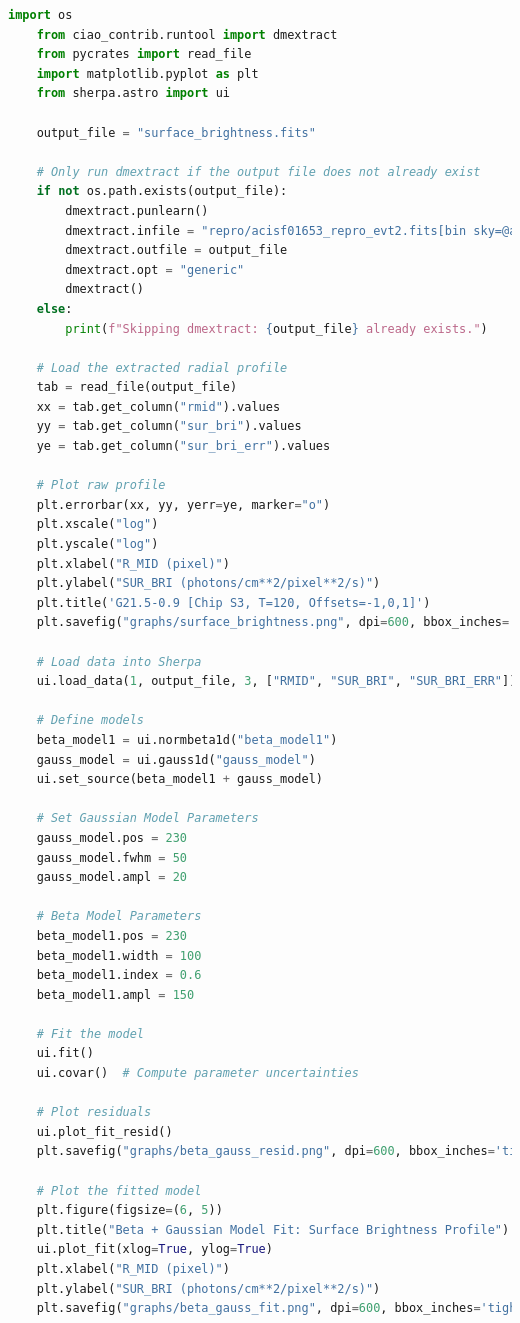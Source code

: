 \documentclass[a4paper,12pt]{article}
\begin{document}
\begin{lstlisting}[language=python]
    import os
    from ciao_contrib.runtool import dmextract
    from pycrates import read_file
    import matplotlib.pyplot as plt
    from sherpa.astro import ui
    
    output_file = "surface_brightness.fits"
    
    # Only run dmextract if the output file does not already exist
    if not os.path.exists(output_file):
        dmextract.punlearn()
        dmextract.infile = "repro/acisf01653_repro_evt2.fits[bin sky=@annuli.reg]"
        dmextract.outfile = output_file
        dmextract.opt = "generic"
        dmextract()
    else:
        print(f"Skipping dmextract: {output_file} already exists.")
    
    # Load the extracted radial profile
    tab = read_file(output_file)
    xx = tab.get_column("rmid").values
    yy = tab.get_column("sur_bri").values
    ye = tab.get_column("sur_bri_err").values
    
    # Plot raw profile
    plt.errorbar(xx, yy, yerr=ye, marker="o")
    plt.xscale("log")
    plt.yscale("log")
    plt.xlabel("R_MID (pixel)")
    plt.ylabel("SUR_BRI (photons/cm**2/pixel**2/s)")
    plt.title('G21.5-0.9 [Chip S3, T=120, Offsets=-1,0,1]')
    plt.savefig("graphs/surface_brightness.png", dpi=600, bbox_inches='tight')
    
    # Load data into Sherpa
    ui.load_data(1, output_file, 3, ["RMID", "SUR_BRI", "SUR_BRI_ERR"])
    
    # Define models
    beta_model1 = ui.normbeta1d("beta_model1")
    gauss_model = ui.gauss1d("gauss_model")
    ui.set_source(beta_model1 + gauss_model)
    
    # Set Gaussian Model Parameters
    gauss_model.pos = 230
    gauss_model.fwhm = 50
    gauss_model.ampl = 20
    
    # Beta Model Parameters
    beta_model1.pos = 230
    beta_model1.width = 100
    beta_model1.index = 0.6
    beta_model1.ampl = 150
    
    # Fit the model
    ui.fit()
    ui.covar()  # Compute parameter uncertainties
    
    # Plot residuals
    ui.plot_fit_resid()
    plt.savefig("graphs/beta_gauss_resid.png", dpi=600, bbox_inches='tight')
    
    # Plot the fitted model
    plt.figure(figsize=(6, 5))
    plt.title("Beta + Gaussian Model Fit: Surface Brightness Profile")
    ui.plot_fit(xlog=True, ylog=True)
    plt.xlabel("R_MID (pixel)")
    plt.ylabel("SUR_BRI (photons/cm**2/pixel**2/s)")
    plt.savefig("graphs/beta_gauss_fit.png", dpi=600, bbox_inches='tight')
\end{lstlisting}
\end{document}
